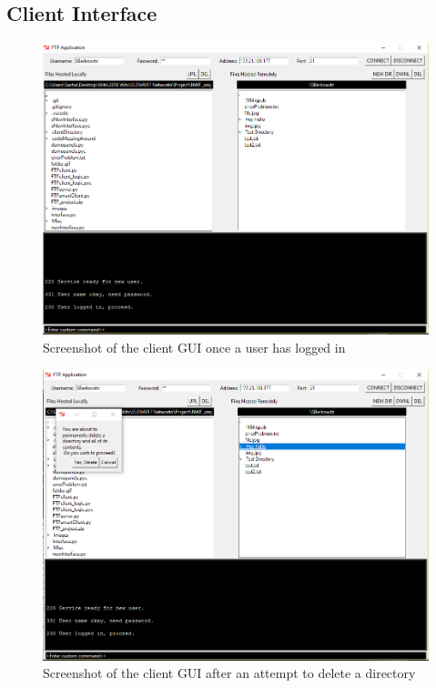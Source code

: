 \documentclass[10pt,twocolumn]{witseiepaper}
\begin{document}
\begin{appendix}
\newpage

\section{Client Interface}\label{sec:GUIAppendix}
\begin{figure}[h]
\centering
\includegraphics[width=0.8\columnwidth]{interface.png}
\caption{Screenshot of the client GUI once a user has logged in}
\raggedright
\label{fig:ClientGUI}
\end{figure}

\begin{figure}[h]
\centering
\includegraphics[width=0.8\columnwidth]{delDir.png}
\caption{Screenshot of the client GUI after an attempt to delete a directory}
\raggedright
\label{fig:ClientDel}
\end{figure}

\end{appendix} 	

\end{document}
